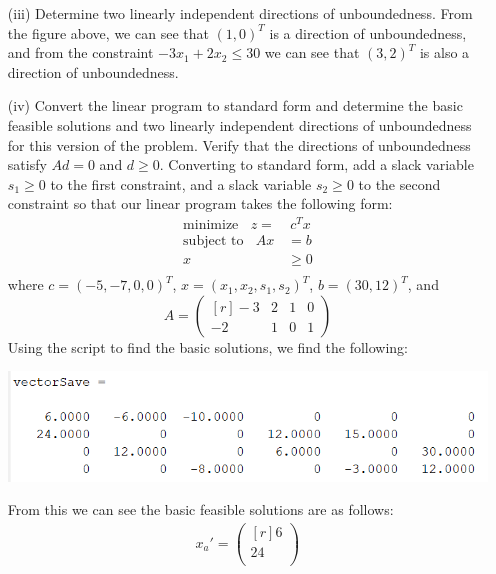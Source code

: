 \documentclass{article}
\begin{document}
\begin{itemize}
    \item[(iii)] Determine two linearly independent directions of unboundedness.
    \newline\newline
    From the figure above, we can see that $(1,0)^T$ is a direction of unboundedness, and from the constraint $-3x_1 + 2x_2 \leq 30$ we can see that $(3,2)^T$ is also a direction of unboundedness.

    \item[(iv)] Convert the linear program to standard form and determine the basic feasible solutions and two linearly independent directions of unboundedness for this version of the problem. Verify that the directions of unboundedness satisfy $Ad = 0$ and $d \geq 0$.
    \newline\newline
    Converting to standard form, add a slack variable $s_1 \geq 0$ to the first constraint, and a slack variable $s_2 \geq 0$ to the second constraint so that our linear program takes the following form:
    \begin{align*}
        \text{minimize} \:\:\:\: z =& \:c^Tx\\
        \text{subject to} \:\:\:\: Ax &= b\\
        x &\geq 0\\
    \end{align*}
    where $c = (-5,-7,0,0)^T$, $x = (x_1,x_2,s_1,s_2)^T$, $b = (30,12)^T$, and
    \[A = \begin{pmatrix*}[r]
        -3 & 2 & 1 & 0\\
        -2 & 1 & 0 & 1
    \end{pmatrix*}\]
    Using the script to find the basic solutions, we find the following:
    \begin{center}
        \includegraphics[scale = 0.75]{vector43}
    \end{center}
    From this we can see the basic feasible solutions are as follows:
    \begin{align*}
        x_a' = \begin{pmatrix*}[r]
            6\\
            24\\

\end{pmatrix*}
\end{align*}
\end{itemize}
\end{document}
